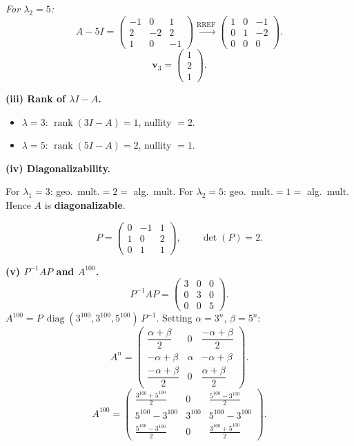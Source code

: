 \documentclass[12pt,a3paper]{article}
\begin{document}
\begin{tcolorbox}
\textit{For $\lambda_2=5$:}
\[
  A-5I=\begin{pmatrix}-1&0&1\\2&-2&2\\1&0&-1\end{pmatrix}
  \xrightarrow{\text{RREF}}\begin{pmatrix}1&0&-1\\0&1&-2\\0&0&0\end{pmatrix}.
\]
\[
  \mathbf{v}_3=\begin{pmatrix}1\\2\\1\end{pmatrix}.
\]

\textbf{(iii) Rank of $\lambda I-A$.}
\begin{itemize}[itemsep=2pt]
  \item $\lambda=3$: $\operatorname{rank}(3I-A)=1$, nullity $=2$.
  \item $\lambda=5$: $\operatorname{rank}(5I-A)=2$, nullity $=1$.
\end{itemize}

\textbf{(iv) Diagonalizability.}

For $\lambda_1=3$: geo.\ mult.$=2=$ alg.\ mult. For $\lambda_2=5$: geo.\ mult.$=1=$ alg.\ mult.
Hence $A$ is \textbf{diagonalizable}.

\[
  P=\begin{pmatrix}0&-1&1\\1&0&2\\0&1&1\end{pmatrix},\qquad \det(P)=2.
\]

\textbf{(v) $P^{-1}AP$ and $A^{100}$.}
\[
  P^{-1}AP=\begin{pmatrix}3&0&0\\0&3&0\\0&0&5\end{pmatrix}.
\]
$A^{100}=P\,\operatorname{diag}(3^{100},3^{100},5^{100})\,P^{-1}$.
Setting $\alpha=3^n$, $\beta=5^n$:
\[
  A^n=\begin{pmatrix}
    \dfrac{\alpha+\beta}{2} & 0 & \dfrac{-\alpha+\beta}{2}\\[8pt]
    -\alpha+\beta & \alpha & -\alpha+\beta\\[8pt]
    \dfrac{-\alpha+\beta}{2} & 0 & \dfrac{\alpha+\beta}{2}
  \end{pmatrix}.
\]
\[
  \boxed{A^{100}=\begin{pmatrix}
    \frac{3^{100}+5^{100}}{2} & 0 & \frac{5^{100}-3^{100}}{2}\\[6pt]
    5^{100}-3^{100} & 3^{100} & 5^{100}-3^{100}\\[6pt]
    \frac{5^{100}-3^{100}}{2} & 0 & \frac{3^{100}+5^{100}}{2}
  \end{pmatrix}.}
\]

\end{tcolorbox}
\end{document}

